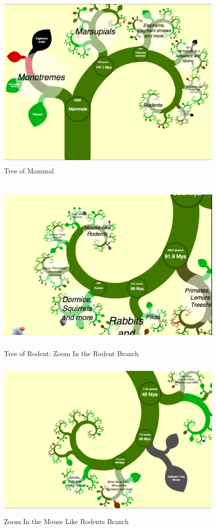\documentclass[MSc]{icldt}
\begin{document}
\begin{figure}[H]
  \centering
  \includegraphics [width=15cm,height=8.8cm]{Mammal}
  \caption{Tree of Mammal}
  \label{fig:mammal}
\end{figure}

\begin{figure}[H]
  \centering
  \includegraphics [width=15cm,height=8.8cm]{Rodent}
  \caption{Tree of Rodent: Zoom In the Rodent Branch}
  \label{fig:rodent}
\end{figure}

\begin{figure}[H]
  \centering
  \includegraphics [width=15cm,height=8cm]{MouseLikeRodent}
  \caption{Zoom In the Mouse Like Rodents Branch}
  \label{fig:mouseLikeRodent}
\end{figure}
\end{document}
